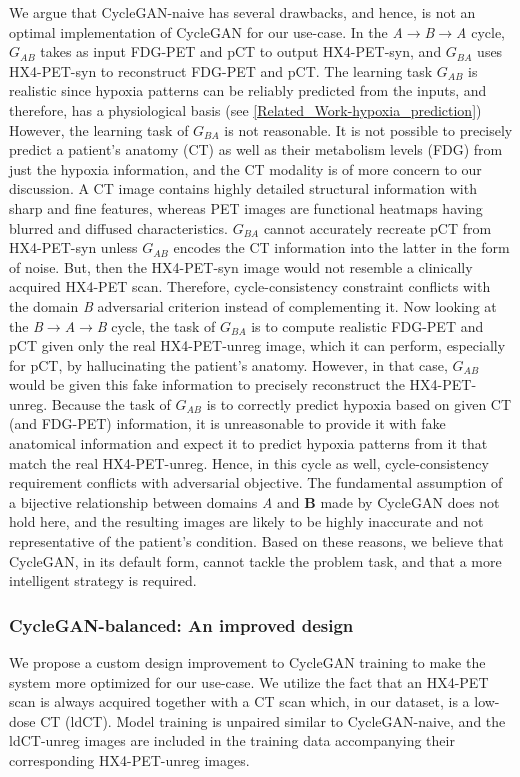We argue that CycleGAN-naive has several drawbacks, and hence, is not an optimal implementation of CycleGAN for our use-case. In the \textit{A}$\rightarrow$\textit{B}$\rightarrow$\textit{A} cycle, $G_{AB}$ takes as input FDG-PET and pCT to output HX4-PET-syn, and $G_{BA}$ uses HX4-PET-syn to reconstruct FDG-PET and pCT. The learning task $G_{AB}$ is realistic since hypoxia patterns can be reliably predicted from the inputs, and therefore, has a physiological basis (see \ref{Related_Work-hypoxia_prediction}) However, the learning task of $G_{BA}$ is not reasonable. It is not possible to precisely predict a patient's anatomy (CT) as well as their metabolism levels (FDG) from just the hypoxia information, and the CT modality is of more concern to our discussion. A CT image contains highly detailed structural information with sharp and fine features, whereas PET images are functional heatmaps having blurred and diffused characteristics. $G_{BA}$ cannot accurately recreate pCT from HX4-PET-syn unless $G_{AB}$ encodes the CT information into the latter in the form of noise. But, then the HX4-PET-syn image would not resemble a clinically acquired HX4-PET scan. Therefore, cycle-consistency constraint conflicts with the domain \textit{B} adversarial criterion instead of complementing it. Now looking at the \textit{B}$\rightarrow$\textit{A}$\rightarrow$\textit{B} cycle, the task of $G_{BA}$ is to compute realistic FDG-PET and pCT given only the real HX4-PET-unreg image, which it can perform, especially for pCT, by hallucinating the patient's anatomy. However, in that case, $G_{AB}$ would be given this fake information to precisely reconstruct the HX4-PET-unreg. Because the task of $G_{AB}$ is to correctly predict hypoxia based on given CT (and FDG-PET) information, it is unreasonable to provide it with fake anatomical information and expect it to predict hypoxia patterns from it that match the real HX4-PET-unreg. Hence, in this cycle as well, cycle-consistency requirement conflicts with adversarial objective. The fundamental assumption of a bijective relationship between domains \textit{A} and \textbf{B} made by CycleGAN does not hold here, and the resulting images are likely to be highly inaccurate and not representative of the patient's condition. Based on these reasons, we believe that CycleGAN, in its default form, cannot tackle the problem task, and that a more intelligent strategy is required.

\subsubsection{CycleGAN-balanced: An improved design}
We propose a custom design improvement to CycleGAN training to make the system more optimized for our use-case. We utilize the fact that an HX4-PET scan is always acquired together with a CT scan which, in our dataset, is a low-dose CT (ldCT). Model training is unpaired similar to CycleGAN-naive, and the ldCT-unreg images are included in the training data accompanying their corresponding HX4-PET-unreg images. 

